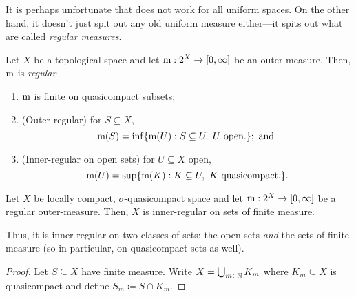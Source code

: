 It is perhaps unfortunate that  does not work for all uniform spaces.  On the other hand, it doesn't just spit out any old uniform measure either---it spits out what are called \emph{regular measures}.
\begin{dfn}\label{RegularMeasure}
Let $X$ be a topological space and let $\mathrm{m} :2^X\rightarrow [0,\infty ]$ be an outer-measure.  Then, $\mathrm{m}$ is \emph{regular}
\begin{enumerate}
\item $\mathrm{m}$ is finite on quasicompact subsets;
\item (Outer-regular) for $S\subseteq X$,
\begin{equation}
\meas (S)=\inf \{ \meas (U):S\subseteq U,\ U\text{ open.}\} ;\text{ and }
\end{equation}
\item (Inner-regular on open sets) for $U\subseteq X$ open,
\begin{equation}
\mathrm{m} (U)=\sup \{ \mathrm{m} (K):K\subseteq U,\ K\text{ quasicompact.}\} .
\end{equation}
\end{enumerate}
\end{dfn}
\begin{prp}
Let $X$ be locally compact, $\sigma$-quasicompact space and let $\mathrm{m} :2^X\rightarrow [0,\infty ]$ be a regular outer-measure.  Then, $X$ is inner-regular on sets of finite measure.
\begin{rmk}
Thus, it is inner-regular on two classes of sets:  the open sets \emph{and} the sets of finite measure (so in particular, on quasicompact sets as well).
\end{rmk}
\begin{proof}
Let $S\subseteq X$ have finite measure.  Write $X=\bigcup _{m\in \mathbb{N}}K_m$ where $K_m\subseteq X$ is quasicompact and define $S_m\coloneqq S\cap K_m$.
\end{proof}
\end{prp}

